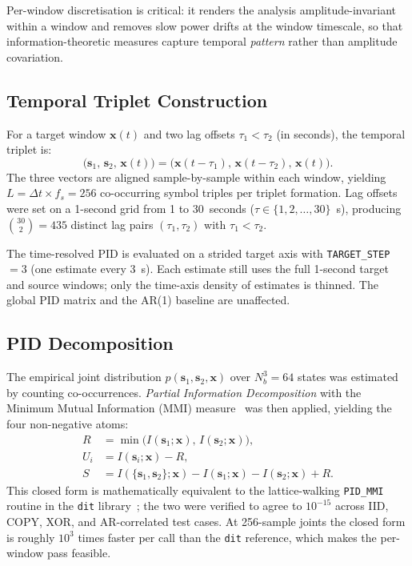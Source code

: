 \documentclass[11pt,a4paper]{article}
\begin{document}
Per-window discretisation is critical: it renders the analysis
amplitude-invariant within a window and removes slow power drifts at the
window timescale, so that information-theoretic measures capture temporal
\emph{pattern} rather than amplitude covariation.

\subsection{Temporal Triplet Construction}

For a target window $\mathbf{x}(t)$ and two lag offsets $\tau_1 < \tau_2$
(in seconds), the temporal triplet is:
\begin{equation}
  \bigl(\mathbf{s}_1,\, \mathbf{s}_2,\, \mathbf{x}(t)\bigr)
  = \bigl(\mathbf{x}(t - \tau_1),\, \mathbf{x}(t - \tau_2),\, \mathbf{x}(t)\bigr).
\end{equation}
The three vectors are aligned sample-by-sample within each window, yielding
$L = \Delta t \times f_s = 256$ co-occurring symbol triples per triplet
formation.  Lag offsets were set on a 1-second grid from 1 to 30~seconds
($\tau \in \{1, 2, \ldots, 30\}$~s), producing $\binom{30}{2} = 435$ distinct
lag pairs $(\tau_1, \tau_2)$ with $\tau_1 < \tau_2$.

The time-resolved PID is evaluated on a strided target axis with
\texttt{TARGET\_STEP} $= 3$ (one estimate every 3~s).  Each estimate still
uses the full 1-second target and source windows; only the time-axis density
of estimates is thinned.  The global PID matrix and the AR(1) baseline are
unaffected.

\subsection{PID Decomposition}

The empirical joint distribution $p(\mathbf{s}_1, \mathbf{s}_2, \mathbf{x})$
over $N_b^3 = 64$ states was estimated by counting co-occurrences.
\emph{Partial Information Decomposition} with the Minimum Mutual Information
(MMI) measure~\citep{barrett2015exploration} was then applied, yielding the
four non-negative atoms:
\begin{align}
  R &= \min\!\bigl(I(\mathbf{s}_1;\mathbf{x}),\, I(\mathbf{s}_2;\mathbf{x})\bigr), \\
  U_i &= I(\mathbf{s}_i;\mathbf{x}) - R, \\
  S &= I(\{\mathbf{s}_1,\mathbf{s}_2\};\mathbf{x})
      - I(\mathbf{s}_1;\mathbf{x}) - I(\mathbf{s}_2;\mathbf{x}) + R.
\end{align}
This closed form is mathematically equivalent to the lattice-walking
\texttt{PID\_MMI} routine in the \texttt{dit}
library~\citep{james2018dit}; the two were verified to agree to
$10^{-15}$ across IID, COPY, XOR, and AR-correlated test cases.  At
256-sample joints the closed form is roughly $10^3$ times faster per call
than the \texttt{dit} reference, which makes the per-window pass feasible.
\end{document}
